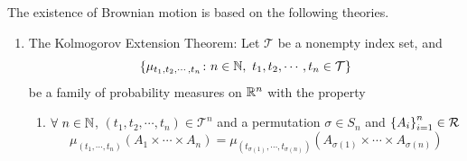 \documentclass[a4paper,12pt]{article}
\begin{document}
\begin{itemize}
  The existence of Brownian motion is based on the following theories.
  \begin{enumerate}[label=(\arabic*)]
    \item The Kolmogorov Extension Theorem: Let $\mathcal{T}$ be a nonempty index set, and
    \begin{equation*}
      \left\{\mu_{t_1,t_2,\cdots,t_n} \colon n \in \mathbb{N},~t_1,t_2,\cdots,t_n\in \mathcal{T}\right\}
    \end{equation*}
    be a family of probability measures on $\mathbb{R}^n$ with the property
    \begin{enumerate}[label=(\roman*)]
      \item $\forall~n\in \mathbb{N}$, $(t_1,t_2,\cdots,t_n) \in \mathcal{T}^n$ and a permutation $\sigma \in S_n$ and $\left\{A_i\right\}_{i=1}^n \in \mathcal{R}$
      \begin{equation*}
        \mu_{(t_1,\cdots,t_n)}(A_1\times\cdots\times A_n) = \mu_{(t_{\sigma(1)},\cdots,t_{\sigma(n)})}(A_{\sigma(1)}\times\cdots\times A_{\sigma(n)})
      \end{equation*}


\end{enumerate}
\end{enumerate}
\end{itemize}
\end{document}
